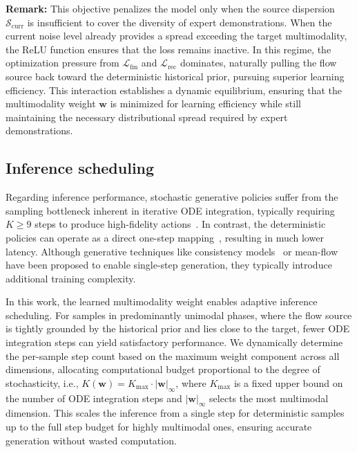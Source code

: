 \textbf{Remark:} This objective penalizes the model only when the source dispersion $\mathcal{S}_{\mathrm{curr}}$ is insufficient to cover the diversity of expert demonstrations. When the current noise level already provides a spread exceeding the target multimodality, the ReLU function ensures that the loss remains inactive. In this regime, the optimization pressure from $\mathcal{L}_{\mathrm{fm}}$ and $\mathcal{L}_{\mathrm{rec}}$ dominates, naturally pulling the flow source back toward the deterministic historical prior, pursuing superior learning efficiency. This interaction establishes a dynamic equilibrium, ensuring that the multimodality weight $\mathbf{w}$ is minimized for learning efficiency while still maintaining the necessary distributional spread required by expert demonstrations.

\subsection{Inference scheduling}

Regarding inference performance, stochastic generative policies suffer from the sampling bottleneck inherent in iterative ODE integration, typically requiring $K \geq 9$ steps to produce high-fidelity actions~\citep{pan2025much,intelligence2025pi,intelligence2025pi05, black2024pi_0}. In contrast, the deterministic policies can operate as a direct one-step mapping~\citep{jia2026action}, resulting in much lower latency. Although generative techniques like consistency models~\citep{li2026ofp, Consistency} or mean-flow~\citep{fang2025omp, geng2026mean} have been proposed to enable single-step generation, they typically introduce additional training complexity. 

In this work, the learned multimodality weight enables adaptive inference scheduling. For samples in predominantly unimodal phases, where the flow source is tightly grounded by the historical prior and lies close to the target, fewer ODE integration steps can yield satisfactory performance. We dynamically determine the per-sample step count based on the maximum weight component across all dimensions, allocating computational budget proportional to the degree of stochasticity, i.e., $K(\mathbf{w}) = K_{\max} \cdot |\mathbf{w}|_\infty $, where $K_{\max}$ is a fixed upper bound on the number of ODE integration steps and $|\mathbf{w}|_\infty$ selects the most multimodal dimension. This scales the inference from a single step for deterministic samples up to the full step budget for highly multimodal ones, ensuring accurate generation without wasted computation.

